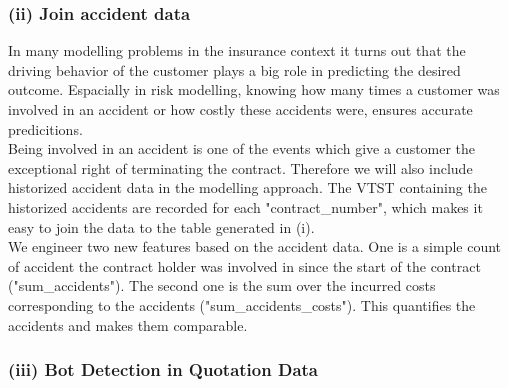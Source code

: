 \documentclass[12pt,titlepage]{article}
\begin{document}
\subsubsection*{(ii) Join accident data}
In many modelling problems in the insurance context it turns out that the driving behavior of the customer plays a big role in predicting the desired outcome. Espacially in risk modelling, knowing how many times a customer was involved in an accident or how costly these accidents were, ensures accurate predicitions. \\
Being involved in an accident is one of the events which give a customer the exceptional right of terminating the contract. Therefore we will also include historized accident data in the modelling approach. The VTST containing the historized accidents are recorded for each "contract\_number", which makes it easy to join the data to the table generated in (i). \\
We engineer two new features based on the accident data. One is a simple count of accident the contract holder was involved in since the start of the contract ("sum\_accidents"). The second one is the sum over the incurred costs corresponding to the accidents ("sum\_accidents\_costs"). This quantifies the accidents and makes them comparable. \\


\subsubsection*{(iii) Bot Detection in Quotation Data}
\end{document}
